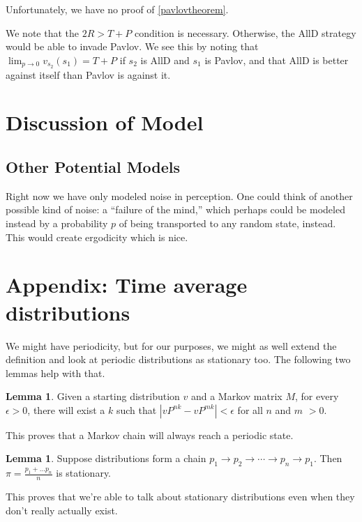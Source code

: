 \documentclass[11pt]{amsart}
\theoremstyle{definition}
\newtheorem{lemma}[theorem]{Lemma}
\theoremstyle{remark}
\begin{document}
    Unfortunately, we have no proof of \cref{pavlovtheorem}.

    We note that the $2R > T + P$ condition is necessary. Otherwise, the AllD strategy would be able to invade Pavlov. We see this by noting that $\lim_{p \to 0} v_{s_2}(s_1) = T + P$ if $s_2$ is AllD and $s_1$ is Pavlov, and that AllD is better against itself than Pavlov is against it.



    \section{Discussion of Model}
    \label{sectiondiscussion}



    \subsection{Other Potential Models}

    Right now we have only modeled noise in perception. One could think of another possible kind of noise: a ``failure of the mind,'' which perhaps could be modeled instead by a probability $p$ of being transported to any random state, instead. This would create ergodicity which is nice.

    \section{Appendix: Time average distributions}

    We might have periodicity, but for our purposes, we might as well extend the definition and look at periodic distributions as stationary too. The following two lemmas help with that.

    \begin{lemma}
      Given a starting distribution $v$ and a Markov matrix $M$, for every $\epsilon > 0$, there will exist a $k$ such that $|vP^{nk} - vP^{mk}| < \epsilon$ for all $n$ and $m$ $> 0$.
    \end{lemma}

    This proves that a Markov chain will always reach a periodic state.

    \begin{lemma}
      Suppose distributions form a chain $p_1 \to p_2 \to \cdots \to p_n \to p_1$. Then $\pi = \frac{p_1 + \ldots p_n}{n}$ is stationary.
    \end{lemma}

    This proves that we're able to talk about stationary distributions even when they don't really actually exist.
\end{document}
